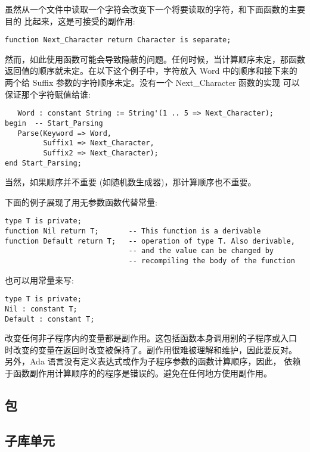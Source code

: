 \begin{blockindent}
虽然从一个文件中读取一个字符会改变下一个将要读取的字符，和下面函数的主要目的
比起来，这是可接受的副作用:
\begin{lstlisting}
function Next_Character return Character is separate;
\end{lstlisting}
然而，如此使用函数可能会导致隐蔽的问题。任何时候，当计算顺序未定，那函数
返回值的顺序就未定。在以下这个例子中，字符放入 Word 中的顺序和接下来的
两个给 Suffix 参数的字符顺序未定。没有一个 Next\_Character 函数的实现
可以保证那个字符赋值给谁:
\begin{lstlisting}
   Word : constant String := String'(1 .. 5 => Next_Character);
begin  -- Start_Parsing
   Parse(Keyword => Word,
         Suffix1 => Next_Character,
         Suffix2 => Next_Character);
end Start_Parsing;
\end{lstlisting}

当然，如果顺序并不重要 (如随机数生成器)，那计算顺序也不重要。

下面的例子展现了用无参数函数代替常量:
\begin{lstlisting}
type T is private;
function Nil return T;       -- This function is a derivable 
function Default return T;   -- operation of type T. Also derivable, 
                             -- and the value can be changed by
                             -- recompiling the body of the function
\end{lstlisting}
也可以用常量来写:
\begin{lstlisting}
type T is private;
Nil : constant T;
Default : constant T;
\end{lstlisting}
\end{blockindent}

\begin{blockindent}
改变任何非子程序内的变量都是副作用。这包括函数本身调用别的子程序或入口
时改变的变量在返回时改变被保持了。副作用很难被理解和维护，因此要反对。
另外，Ada 语言没有定义表达式或作为子程序参数的函数计算顺序，因此，
依赖于函数副作用计算顺序的的程序是错误的。避免在任何地方使用副作用。
\end{blockindent}

\subsection{包}
\begin{blockindent}
\end{blockindent}

\subsection{子库单元}
\label{c:prog-struct:high-level:child-lib-unit}
